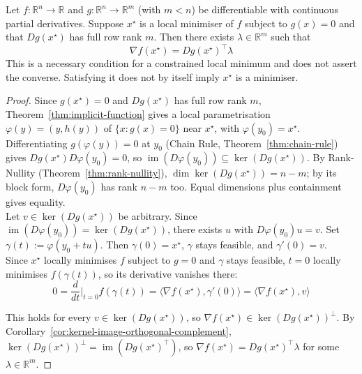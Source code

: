 	\begin{theorem}
		\label{thm:lagrange-multipliers}
		Let $f:\mathbb{R}^n \to \mathbb{R}$ and $g:\mathbb{R}^n \to \mathbb{R}^m$ (with $m<n$) be differentiable with continuous partial derivatives. Suppose $x^\star$ is a local minimiser of $f$ subject to $g(x)=0$ and that $Dg(x^\star)$ has full row rank $m$. Then there exists $\lambda \in \mathbb{R}^m$ such that
		\[
			\nabla f(x^\star) = Dg(x^\star)^\top \lambda
		\]
		This is a necessary condition for a constrained local minimum and does not assert the converse. Satisfying it does not by itself imply $x^\star$ is a minimiser.
	\end{theorem}
	
	\begin{proof}
		Since $g(x^\star)=0$ and $Dg(x^\star)$ has full row rank $m$, Theorem~\ref{thm:implicit-function} gives a local parametrisation $\varphi(y)=(y,h(y))$ of $\{x:g(x)=0\}$ near $x^\star$, with $\varphi(y_0)=x^\star$. \\
		
		Differentiating $g(\varphi(y))=0$ at $y_0$ (Chain Rule, Theorem~\ref{thm:chain-rule}) gives $Dg(x^\star)D\varphi(y_0)=0$, so $\operatorname{im}(D\varphi(y_0))\subseteq\ker(Dg(x^\star))$. By Rank-Nullity (Theorem~\ref{thm:rank-nullity}), $\dim\ker(Dg(x^\star))=n-m$; by its block form, $D\varphi(y_0)$ has rank $n-m$ too. Equal dimensions plus containment gives equality. \\
		
		Let $v\in\ker(Dg(x^\star))$ be arbitrary. Since $\operatorname{im}(D\varphi(y_0))=\ker(Dg(x^\star))$, there exists $u$ with $D\varphi(y_0)u=v$. Set $\gamma(t):=\varphi(y_0+tu)$. Then $\gamma(0)=x^\star$, $\gamma$ stays feasible, and $\gamma'(0)=v$. \\
		
		Since $x^\star$ locally minimises $f$ subject to $g=0$ and $\gamma$ stays feasible, $t=0$ locally minimises $f(\gamma(t))$, so its derivative vanishes there:
		\[
			0 = \frac{d}{dt}\Big|_{t=0}f(\gamma(t)) = \langle\nabla f(x^\star),\gamma'(0)\rangle = \langle\nabla f(x^\star),v\rangle
		\]
		
		This holds for every $v\in\ker(Dg(x^\star))$, so $\nabla f(x^\star)\in\ker(Dg(x^\star))^\perp$. By Corollary~\ref{cor:kernel-image-orthogonal-complement}, $\ker(Dg(x^\star))^\perp = \operatorname{im}(Dg(x^\star)^\top)$, so $\nabla f(x^\star)=Dg(x^\star)^\top\lambda$ for some $\lambda\in\mathbb{R}^m$.
	\end{proof}
	
